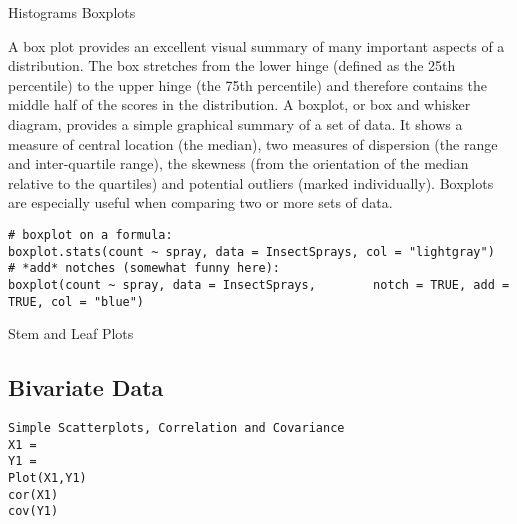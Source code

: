 Histograms
Boxplots

A box plot provides an excellent visual summary of many important aspects of a distribution. 
The box stretches from the lower hinge (defined as the 25th percentile) to the upper hinge (the 75th percentile) and therefore contains the middle half of the scores in the distribution.
A boxplot, or box and whisker diagram, provides a simple graphical summary of a set of data. It shows a measure of central location (the median), two measures of dispersion (the range and inter-quartile range), the skewness (from the orientation of the median relative to the quartiles) and potential outliers (marked individually). 
Boxplots are especially useful when comparing two or more sets of data. 
\begin{verbatim}
# boxplot on a formula:
boxplot.stats(count ~ spray, data = InsectSprays, col = "lightgray")
# *add* notches (somewhat funny here):
boxplot(count ~ spray, data = InsectSprays,        notch = TRUE, add = TRUE, col = "blue")
\end{verbatim}
Stem and Leaf Plots

\subsection{Bivariate Data}
\begin{verbatim}
Simple Scatterplots, Correlation and Covariance
X1 =
Y1 =
Plot(X1,Y1)
cor(X1)
cov(Y1)
\end{verbatim}

